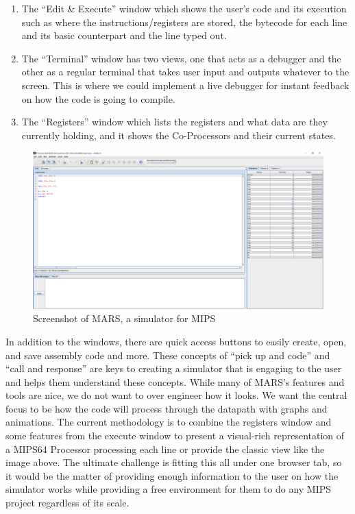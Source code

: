 \documentclass[
    parskip=half,
    fontsize=12pt,
    titlepage=firstiscover,
    toc=bibliography,
    numbers=endperiod
]{scrartcl}
\providecommand{\tightlist}{%
  \setlength{\itemsep}{0pt}\setlength{\parskip}{0pt}}
\begin{document}
\begin{enumerate}
    \tightlist
    \item The ``Edit \& Execute'' window which shows the user's code and its
        execution such as where the instructions/registers are stored, the
        bytecode for each line and its basic counterpart and the line typed out.
    \item The ``Terminal'' window has two views, one that acts as a debugger
        and the other as a regular terminal that takes user input and outputs
        whatever to the screen. This is where we could implement a live debugger
        for instant feedback on how the code is going to compile.
    \item The ``Registers'' window which lists the registers and what data are
        they currently holding, and it shows the Co-Processors and their current
        states.
\end{enumerate}

\begin{figure}[H]
    \includegraphics[width=\textwidth]{mars}
    \caption{Screenshot of MARS, a simulator for MIPS}
    \label{fig:mars}
\end{figure}

In addition to the windows, there are quick access buttons to easily
create, open, and save assembly code and more. These concepts of ``pick
up and code'' and ``call and response'' are keys to creating a simulator
that is engaging to the user and helps them understand these concepts.
While many of MARS's features and tools are nice, we do not want to over
engineer how it looks. We want the central focus to be how the code
will process through the datapath with graphs and animations. The
current methodology is to combine the registers window and some features
from the execute window to present a visual-rich representation of a
MIPS64 Processor processing each line or provide the classic view like
the image above. The ultimate challenge is fitting this all under one
browser tab, so it would be the matter of providing enough information
to the user on how the simulator works while providing a free
environment for them to do any MIPS project regardless of its scale.
\end{document}
